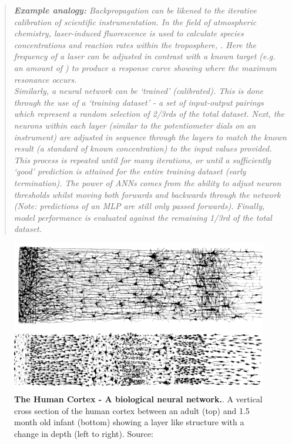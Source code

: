 \begin{quote}
\textit{
\textbf{Example analogy:} Backpropagation can be likened to the iterative calibration of scientific instrumentation. In the field of atmospheric chemistry, laser-induced fluorescence is used to calculate species concentrations and reaction rates within the troposphere, \citep{lif1,lif2}. Here the frequency of a laser can be adjusted in contrast with a known target (e.g. an amount of ) to produce a response curve showing where the maximum resonance occurs.\\
Similarly, a neural network can be `trained' (calibrated).
This is done through the use of a `training dataset' - a set of input-output pairings which represent a random selection of 2/3rds of the total dataset. Next, the neurons within each layer (similar to the potentiometer dials on an instrument) are adjusted in sequence through the layers to match the known result (a standard of known concentration) to the input values provided. This process is repeated until for many iterations, or until a sufficiently `good' prediction is attained for the entire training dataset (early termination). The power of ANNs comes from the ability to adjust neuron thresholds whilst moving both forwards and backwards through the network (Note: predictions of an MLP are still only passed forwards). Finally, model performance is evaluated against the remaining 1/3rd of the total dataset.
}
\end{quote}


\begin{figure}[H]
     \centering
         \includegraphics[width=.85\textwidth]{figures_c3/mlpregressor/Cajal_cortex_drawings.png}
        \caption{\textbf{The Human Cortex - A biological neural network.}. A vertical cross section of the human cortex between an adult (top) and 1.5 month old infant (bottom) showing a layer like structure with a change in depth (left to right). Source: \cite{layercortex}}
        \label{fig:layercortex}
\end{figure}

